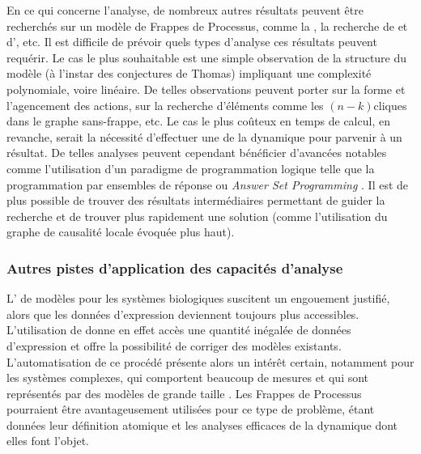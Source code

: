En ce qui concerne l'analyse,
de nombreux autres résultats peuvent être recherchés sur un modèle de Frappes
de Processus, comme la , la recherche
de  et d', etc.
Il est difficile de prévoir quels types d'analyse ces résultats peuvent requérir.
Le cas le plus souhaitable est une simple observation de la structure du modèle
(à l'instar des conjectures de Thomas) impliquant une complexité polynomiale, voire linéaire.
De telles observations peuvent porter sur la forme et l'agencement des actions,
sur la recherche d'éléments comme les $(n-k)$\nbd cliques dans le graphe sans-frappe,
etc.
Le cas le plus coûteux en temps de calcul, en revanche, serait la nécessité d'effectuer
une  de la dynamique pour parvenir à un résultat.
De telles analyses peuvent cependant bénéficier d'avancées notables
comme l'utilisation d'un paradigme de programmation logique
telle que la programmation par ensembles de réponse ou \textit{Answer Set Programming}
.
Il est de plus possible de trouver des résultats intermédiaires
permettant de guider la recherche et de trouver plus rapidement une solution
(comme l'utilisation du graphe de causalité locale évoquée plus haut).



\subsubsection*{Autres pistes d'application des capacités d'analyse}

L' de modèles pour les systèmes biologiques
suscitent un engouement justifié,
alors que les données d'expression deviennent toujours plus accessibles.
L'utilisation de 
donne en effet accès une quantité inégalée de données d'expression
et offre la possibilité de corriger des modèles existants.
L'automatisation de ce procédé présente alors un intérêt certain,
notamment pour les systèmes complexes, qui comportent beaucoup de mesures
et qui sont représentés par des modèles de grande taille
.
Les Frappes de Processus pourraient être avantageusement utilisées pour ce type de problème,
étant données leur définition atomique et les analyses efficaces de la dynamique
dont elles font l'objet.

